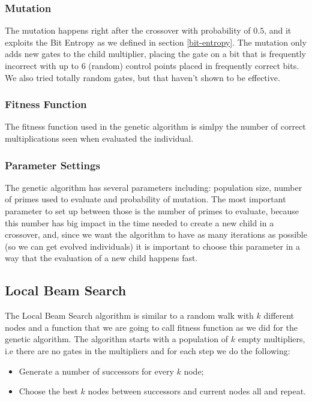 \documentclass[12pt]{article}
\begin{document}
\subsubsection{Mutation}
The mutation happens right after the crossover with probability of $0.5$, and it exploits the Bit Entropy as we defined in section \ref{bit-entropy}. The mutation only adds new gates to the child multiplier, placing the gate on a bit that is frequently incorrect with up to $6$ (random) control points placed in frequently correct bits. We also tried totally random gates, but that haven't shown to be effective.

\subsubsection{Fitness Function}
The fitness function used in the genetic algorithm is simlpy the number of correct multiplications seen when evaluated the individual.

\subsubsection{Parameter Settings}
The genetic algorithm has several parameters including: population size, number of primes used to evaluate and probability of mutation. The most important parameter to set up between those is the number of primes to evaluate, because this number has big impact in the time needed to create a new child in a crossover, and, since we want the algorithm to have as many iterations as possible (so we can get evolved individuals) it is important to choose this parameter in a way that the evaluation of a new child happens fast.


\subsection{Local Beam Search}
The Local Beam Search algorithm is similar to a random walk with $k$ different nodes and a function that we are going to call fitness function as we did for the genetic algorithm. The algorithm starts with a population of $k$ empty multipliers, i.e there are no gates in the multipliers and for each step we do the following:
\begin{itemize}
\item{Generate a number of successors for every $k$ node;}
\item{Choose the best $k$ nodes between successors and current nodes all and repeat.}
\end{itemize}
\end{document}
